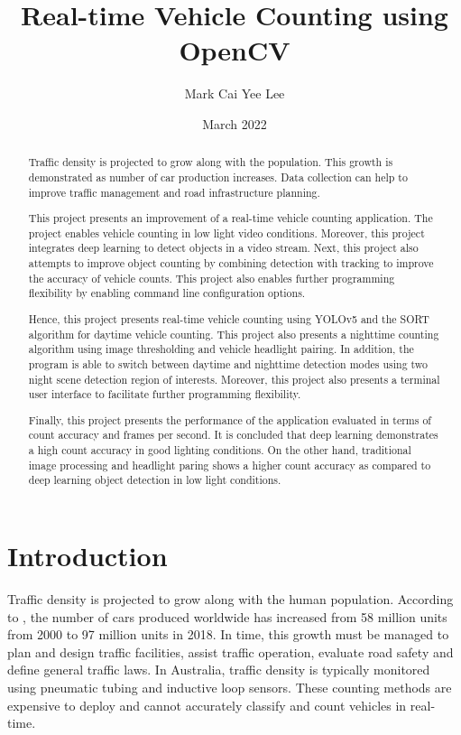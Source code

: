 \documentclass[12pt,a4paper,fleqn]{report}
\title{Real-time Vehicle Counting using OpenCV}
\author{Mark Cai Yee Lee}
\date{March 2022}
\begin{document}
\maketitle

\begin{abstract}
Traffic density is projected to grow along with the population.
This growth is demonstrated as number of car production increases.
Data collection can help to improve traffic management and road infrastructure planning.

This project presents an improvement of a real-time vehicle counting application.
The project enables vehicle counting in low light video conditions.
Moreover, this project integrates deep learning to detect objects in a video stream.
Next, this project also attempts to improve object counting by combining detection with tracking to
improve the accuracy of vehicle counts.
This project also enables further programming flexibility by enabling command line
configuration options.

Hence, this project presents real-time vehicle counting using YOLOv5 and the SORT algorithm for
daytime vehicle counting.
This project also presents a nighttime counting algorithm using image thresholding and vehicle
headlight pairing.
In addition, the program is able to switch between daytime and nighttime detection modes using two
night scene detection region of interests.
Moreover, this project also presents a terminal user interface to facilitate further programming
flexibility.

Finally, this project presents the performance of the application evaluated in terms of count
accuracy and frames per second.
It is concluded that deep learning demonstrates a high count accuracy in good lighting conditions.
On the other hand, traditional image processing and headlight paring shows a higher count accuracy
as compared to deep learning object detection in low light conditions.

\end{abstract}

\tableofcontents
\listoffigures
\begingroup
\let\clearpage\relax
\listoftables
\listoflistings
\endgroup

\chapter{Introduction}

Traffic density is projected to grow along with the human population.
According to \cite{placek:2022}, the number of cars produced worldwide has increased from 58 million
units from 2000 to 97 million units in 2018.
In time, this growth must be managed to plan and design traffic facilities, assist traffic
operation, evaluate road safety and define general traffic laws.
In Australia, traffic density is typically monitored using pneumatic tubing and inductive loop
sensors.
These counting methods are expensive to deploy and cannot accurately classify and count vehicles in
real-time.
\end{document}
